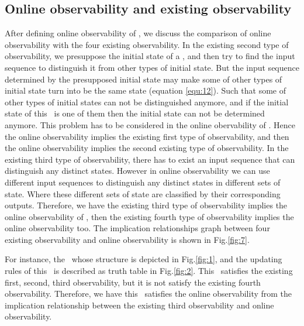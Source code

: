 \subsection{Online observability and existing observability}
After defining online observability of \BCNs, we discuss the comparison of online observability with the four existing observability. In the existing second type of observability, we presuppose the initial state of a \BCN, and then try to find the input sequence to distinguish it from other types of initial state. But the input sequence determined by the presupposed initial state may make some of other types of initial state turn into be the same state (equation \ref{equ:12}). Such that some of other types of initial states can not be distinguished anymore, and if the initial state of this \BCN\ is one of them then the initial state can not be determined anymore. This problem has to be considered in the online obervability of \BCNs. Hence the online observability implies the existing first type of observability, and then the online observability implies the second existing type of observability. In the existing third type of observability, there has to exist an input sequence that can distinguish any distinct states. However in online observability we can use different input sequences to distinguish any distinct states in different sets of state. Where these different sets of state are classified by their corresponding outputs. Therefore, we have the existing third type of observability implies the online observability of \BCNs, then the existing fourth type of observability implies the online observability too. The implication relationships graph between four existing observability and online observability is shown in Fig.\ref{fig:7}.
\begin{example}
For instance, the \BCN\ whose structure is depicted in Fig.\ref{fig:1}, and the updating rules of this \BCN\ is described as truth table in Fig.\ref{fig:2}. This \BCN\ satisfies the existing first, second, third observability, but it is not satisfy the existing fourth observability. Therefore, we have this \BCN\ satisfies the online observability from the implication relationship between the existing third observability and online observability.
\end{example}   

